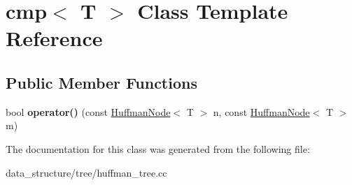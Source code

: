 \hypertarget{classcmp}{}\section{cmp$<$ T $>$ Class Template Reference}
\label{classcmp}
\subsection*{Public Member Functions}
\begin{DoxyCompactItemize}
\item 
\mbox{\label{classcmp_a63c82fa7008ab4338fab59cd7cae753a}} 
bool {\bfseries operator()} (const \hyperlink{structHuffmanNode}{Huffman\+Node}$<$ T $>$ n, const \hyperlink{structHuffmanNode}{Huffman\+Node}$<$ T $>$ m)
\end{DoxyCompactItemize}


The documentation for this class was generated from the following file\+:\begin{DoxyCompactItemize}
\item 
data\+\_\+structure/tree/huffman\+\_\+tree.\+cc\end{DoxyCompactItemize}

